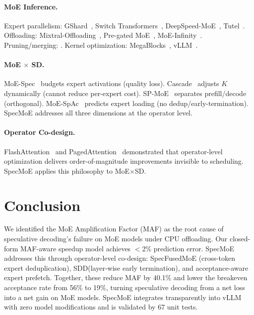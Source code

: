 \documentclass[letterpaper,twocolumn,10pt]{article}
\newcommand{\sysname}{SpecMoE\xspace}
\newcommand{\specfused}{SpecFusedMoE\xspace}
\newcommand{\sdd}{SDD\xspace}
\newcommand{\maf}{MAF\xspace}
\begin{document}
\paragraph{MoE Inference.}
Expert parallelism: GShard~\cite{lepikhin2021gshard}, Switch
Transformers~\cite{fedus2022switch}, DeepSpeed-MoE~\cite{rajbhandari2022deepspeed},
Tutel~\cite{hwang2023tutel}.  Offloading:
Mixtral-Offloading~\cite{eliseev2023mixtral},
Pre-gated MoE~\cite{hwang2023pregated},
MoE-Infinity~\cite{xue2024moeinfinity}.  Pruning/merging:
\cite{lu2024notall,komatsuzaki2023sparse,muqeeth2024soft}.  Kernel
optimization: MegaBlocks~\cite{gale2023megablocks},
vLLM~\cite{kwon2023vllm}.

\paragraph{MoE $\times$ SD.}
MoE-Spec~\cite{yi2025moespec} budgets expert activations (quality loss).
Cascade~\cite{chen2024cascade} adjusts $K$ dynamically (cannot reduce
per-expert cost).  SP-MoE~\cite{jin2024spmoe} separates prefill/decode
(orthogonal).  MoE-SpAc~\cite{park2025moespac} predicts expert loading
(no dedup/early-termination).  \sysname addresses all three dimensions
at the operator level.

\paragraph{Operator Co-design.}
FlashAttention~\cite{dao2022flashattention,dao2024flashattention2} and
PagedAttention~\cite{kwon2023vllm} demonstrated that operator-level
optimization delivers order-of-magnitude improvements invisible to
scheduling.  \sysname applies this philosophy to MoE$\times$SD.

\section{Conclusion}\label{sec:conclusion}

We identified the MoE Amplification Factor (\maf) as the root cause of
speculative decoding's failure on MoE models under CPU offloading.
Our closed-form MAF-aware speedup model achieves $<$2\% prediction error.
\sysname addresses this through operator-level co-design: \specfused
(cross-token expert deduplication), \sdd (layer-wise early termination),
and acceptance-aware expert prefetch.  Together, these reduce \maf by
40.1\% and lower the breakeven acceptance rate from 56\% to 19\%,
turning speculative decoding from a net loss into a net gain on MoE
models.  \sysname integrates transparently into vLLM with zero model
modifications and is validated by 67 unit tests.
\end{document}
